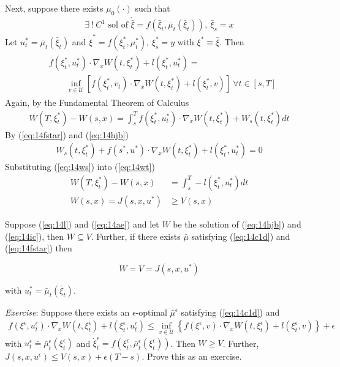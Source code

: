 Next, suppose there exists $\mu_0(\cdot)$ such that
\begin{align}
\label{eq:14c1d}
\exists~!~C^1 \text{~sol~of~} \dot{\bar{\xi}} = f(\bar{\xi}_t,\bar{\mu}_t(\bar{\xi}_t)),~\bar{\xi}_s=x
\end{align}
Let $u_t^\ast=\bar{\mu}_t(\bar{\xi}_t)$ and $\dot{\xi}^\ast = f(\xi_t^\ast,\mu_t^\ast)$, $\xi_s^\ast=y$ with $\xi^\ast\equiv\bar{\xi}$.
Then
\begin{align}
\label{eq:14fstar}
\begin{split}
&f(\xi_t^\ast,u_t^\ast)\cdot\nabla_x W(t,\xi_t^\ast) + l(\xi_t^\ast,u_t^\ast) = \\
&\qquad \inf_{v\in\mathcal{U}}\left[ f(\xi_t^\ast,v_t)\cdot\nabla_x W(t,\xi_t^\ast) + l(\xi_t^\ast,v) \right]~\forall t\in[s,T]
\end{split}
\end{align}
Again, by the Fundamental Theorem of Calculus
\begin{align}
\label{eq:14wt}
W(T,\xi_t^\ast)-W(s,x) = \int_s^T f(\xi_t^\ast,u_t^\ast)\cdot\nabla_x W(t,\xi_t^\ast)+W_s(t,\xi_t^\ast)dt
\end{align}
By (\ref{eq:14fstar}) and (\ref{eq:14hjb})
\begin{align}
\label{eq:14ws}
W_s(t,\xi_t^\ast) + f(s^\ast,u^\ast)\cdot\nabla_x W(t,\xi_t^\ast) + l(\xi_t^\ast,u_t^\ast) = 0
\end{align}
Substituting (\ref{eq:14ws}) into (\ref{eq:14wt})
\begin{align}
\label{eq:14wsx}
W(T,\xi_t^\ast) - W(s,x) &= \int_s^T -l(\xi_t^\ast,u_t^\ast)dt \nonumber \\
W(s,x) = J(s,x,u^\ast) &\geq V(s,x)
\end{align}

\begin{theorem}
Suppose (\ref{eq:14l}) and (\ref{eq:14ae}) and let $W$ be the solution of (\ref{eq:14hjb}) and (\ref{eq:14ic}), then $W\subseteq V$.
Further, if there exists $\bar{\mu}$ satisfying (\ref{eq:14c1d}) and (\ref{eq:14fstar}) then

\begin{equation*}
W=V=J(s,x,u^\ast)
\end{equation*}

with $u_t^\ast = \bar{\mu}_t(\bar{\xi}_t)$.
\end{theorem}

\textit{Exercise}: Suppose there exists an $\epsilon$-optimal $\bar{\mu}^\epsilon$ satisfying (\ref{eq:14c1d}) and
\begin{align}
\label{eq:14feps}
f(\xi^\epsilon,u_t^\epsilon)\cdot\nabla_x W(t,\xi_t^\epsilon) + l(\xi_t^\epsilon,u_t^\epsilon) \leq \inf_{v\in\mathcal{U}} \left\lbrace f(\xi^\epsilon,v)\cdot\nabla_x W(t,\xi_t^\epsilon) + l(\xi_t^\epsilon,v) \right\rbrace + \epsilon
\end{align}
with $u_t^\epsilon\doteq \bar{\mu}_t^\epsilon(\xi_t^\epsilon)$ and $\dot{\xi}_t^\epsilon = f(\xi_t^\epsilon, \bar{\mu}_t^\epsilon(\xi_t^\epsilon))$.
Then $W\geq V$.
Further, $J(s,x,u^\epsilon) \leq V(s,x) + \epsilon(T-s)$.
Prove this as an exercise.

